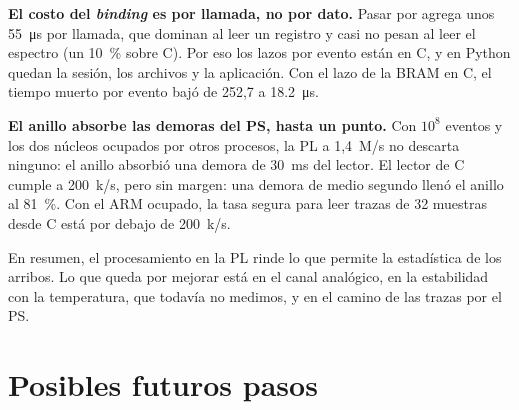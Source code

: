 \textbf{El costo del \emph{binding} es por llamada, no por dato.} Pasar por
 agrega unos \qty{55}{\micro\second} por llamada, que dominan al
leer un registro y casi no pesan al leer el espectro (un \qty{10}{\percent} sobre
C). Por eso los lazos por evento están en C, y en Python quedan la sesión, los
archivos y la aplicación. Con el lazo de la BRAM en C, el tiempo muerto por
evento bajó de 252,7 a \qty{18.2}{\micro\second}.

\textbf{El anillo absorbe las demoras del PS, hasta un punto.} Con $10^8$
eventos y los dos núcleos ocupados por otros procesos, la PL a 1,4~M/s no
descarta ninguno: el anillo absorbió una demora de \qty{30}{\milli\second} del
lector. El lector de C cumple a 200~k/s, pero sin margen: una demora de medio
segundo llenó el anillo al \qty{81}{\percent}. Con el ARM ocupado, la tasa
segura para leer trazas de 32 muestras desde C está por debajo de 200~k/s.

En resumen, el procesamiento en la PL rinde lo que permite la estadística de los
arribos. Lo que queda por mejorar está en el canal analógico, en la estabilidad
con la temperatura, que todavía no medimos, y en el camino de las trazas por el
PS.

\section{Posibles futuros pasos}
\label{S:concl-futuros}

